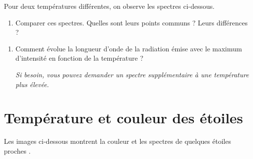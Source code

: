 \documentclass[12pt,a4paper,fleqn]{article}
\newcommand{\thumbsup}{\marginpar{\faThumbsOUp}}
\begin{document}
Pour deux températures différentes, on observe les spectres ci-dessous.
\vspace{100pt}
\begin{enumerate}[resume]
\item \app{}

Comparer ces spectres.
Quelles sont leurs points communs ?
Leurs différences ?
\end{enumerate}

\begin{center}
\end{center}

\begin{enumerate}[resume]
\item \anarai{}

Comment évolue la longueur d'onde de la radiation émise avec le maximum d'intensité en fonction de la température ?

\textit{Si besoin, vous pouvez demander un spectre supplémentaire à une température plus élevée.} \thumbsup{}
\end{enumerate}

\begin{center}
\end{center}

\section*{Température et couleur des étoiles}

Les images ci-dessous montrent la couleur et les spectres de quelques étoiles \og proches \fg{}.
\end{document}
